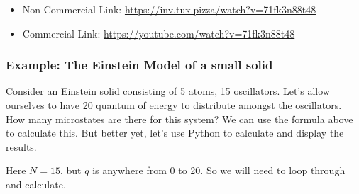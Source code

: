 \begin{itemize}
\tightlist
\item
  Non-Commercial Link: \url{https://inv.tux.pizza/watch?v=71fk3n88t48}
\item
  Commercial Link: \url{https://youtube.com/watch?v=71fk3n88t48}
\end{itemize}

\subsubsection{Example: The Einstein Model of a small
solid}\label{example-the-einstein-model-of-a-small-solid}

Consider an Einstein solid consisting of 5 atoms, 15 oscillators. Let's
allow ourselves to have 20 quantum of energy to distribute amongst the
oscillators. How many microstates are there for this system? We can use
the formula above to calculate this. But better yet, let's use Python to
calculate and display the results.

Here \(N=15\), but \(q\) is anywhere from 0 to 20. So we will need to
loop through and calculate.

\begin{Shaded}
\begin{Highlighting}[]


    \OperatorTok{+}\OperatorTok{{-}} \NormalTok{) }\OperatorTok{/}\OperatorTok{*}\OperatorTok{{-}} \NormalTok{))}

\OperatorTok{=} 
\OperatorTok{=} 

\OperatorTok{=}\OperatorTok{+} \NormalTok{)}
\OperatorTok{=}\NormalTok{ [calculate\_microstates(q, oscillators) }\NormalTok{ quanta\_values]}
\end{Highlighting}
\end{Shaded}

